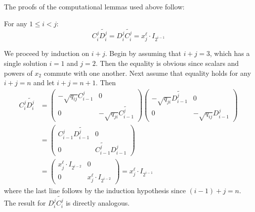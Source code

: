 \documentclass [11pt, proquest] {uwthesis}[2020/02/24]
\begin{document}
        The proofs of the computational lemmas used above follow:
    \begin{lem}\label{lem:monomial}
        For any $1\le i<j$:
        \[C_i^j\widetilde{D_i^j}=D_i^j\widetilde{C_i^j}=x_j^\ell \cdot I_{2^{i-1}}\]
    \end{lem}
    \begin{prf}
        We proceed by induction on $i+j$. Begin by assuming that $i+j=3$, which has a single solution $i=1$ and $j=2$. Then the equality is obvious since scalars and powers of $x_2$ commute with one another. Next assume that equality holds for any $i+j=n$ and let $i+j=n+1.$ Then
        \begin{align*}
            C_i^j\widetilde{D_i^j} &=\begin{pmatrix}-\sqrt{q_{ij}}C_{i-1}^j & 0\\0 & -\sqrt{q_{ji}}\widetilde{C_{i-1}^j}\end{pmatrix}\begin{pmatrix}-\sqrt{q_{ji}}\widetilde{D_{i-1}^j} & 0\\0 & -\sqrt{q_{ij}}D_{i-1}^j\end{pmatrix}\\
            &=\begin{pmatrix}C_{i-1}^j\widetilde{D_{i-1}^j} & 0 \\ 0 & \widetilde{C_{i-1}^j}D_{i-1}^j\end{pmatrix}\\
            &=\begin{pmatrix}x_j^\ell \cdot I_{2^{i-2}} & 0\\0 & x_j^\ell \cdot I_{2^{i-2}}\end{pmatrix}=x_j^\ell \cdot I_{2^{i-1}}
        \end{align*}
        where the last line follows by the induction hypothesis since $(i-1)+j = n.$ The result for $D_i^j\widetilde{C_i^j}$ is directly analogous.
    \end{prf}
        
\end{document}

